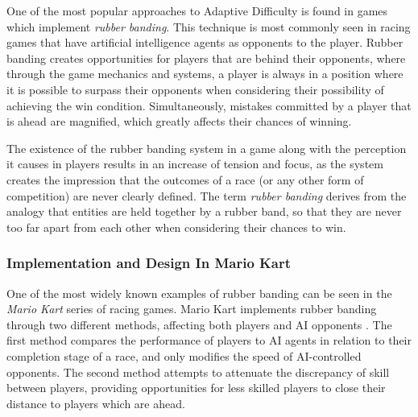 

One of the most popular approaches to Adaptive Difficulty is found in games which implement \emph{rubber banding}. This technique is most commonly seen in racing games that have artificial intelligence agents as opponents to the player. Rubber banding creates opportunities for players that are behind their opponents, where through the game mechanics and systems, a player is always in a position where it is possible to surpass their opponents when considering their possibility of achieving the win condition. Simultaneously, mistakes committed by a player that is ahead are magnified, which greatly affects their chances of winning.

The existence of the rubber banding system in a game along with the perception it causes in players results in an increase of tension and focus, as the system creates the impression that the outcomes of a race (or any other form of competition) are never clearly defined. The term \emph{rubber banding} derives from the analogy that entities are held together by a rubber band, so that they are never too far apart from each other when considering their chances to win.

\subsubsection{Implementation and Design In Mario Kart}

One of the most widely known examples of rubber banding can be seen in the \emph{Mario Kart} series of racing games. Mario Kart implements rubber banding through two different methods, affecting both players and AI opponents \cite{website_rubberbandingmariokart}. The first method compares the performance of players to AI agents in relation to their completion stage of a race, and only modifies the speed of AI-controlled opponents. The second method attempts to attenuate the discrepancy of skill between players, providing opportunities for less skilled players to close their distance to players which are ahead.

